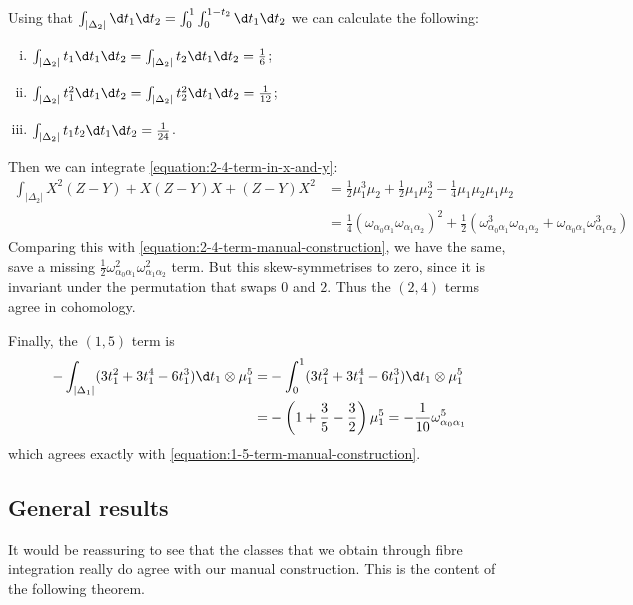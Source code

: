         Using that $\int_{|\Delta_2|}\d t_1\d t_2=\int_0^1\int_0^{1-t_2}\d t_1\d t_2$ we can calculate the following:
        \begin{enumerate}[(i)]
            \item $\int_{|\Delta_2|}t_1\d t_1\d t_2=\int_{|\Delta_2|}t_2\d t_1\d t_2=\frac16$;
            \item $\int_{|\Delta_2|}t_1^2\d t_1\d t_2=\int_{|\Delta_2|}t_2^2\d t_1\d t_2=\frac{1}{12}$;
            \item $\int_{|\Delta_2|}t_1t_2\d t_1\d t_2=\frac{1}{24}$.
        \end{enumerate}
        Then we can integrate \cref{equation:2-4-term-in-x-and-y}:
        \begin{align*}
            \int_{|\Delta_2|}X^2(Z-Y) + X(Z-Y)X + (Z-Y)X^2 &= \frac12\mu_1^3\mu_2 + \frac12\mu_1\mu_2^3 - \frac14\mu_1\mu_2\mu_1\mu_2\\
            &= \frac14(\omega_{\alpha_0\alpha_1}\omega_{\alpha_1\alpha_2})^2 + \frac12(\omega_{\alpha_0\alpha_1}^3\omega_{\alpha_1\alpha_2} + \omega_{\alpha_0\alpha_1}\omega_{\alpha_1\alpha_2}^3)
        \end{align*}
        Comparing this with \cref{equation:2-4-term-manual-construction}, we have the same, save a missing $\frac12\omega_{\alpha_0\alpha_1}^2\omega_{\alpha_1\alpha_2}^2$ term.
        But this skew-symmetrises to zero, since it is invariant under the permutation that swaps $0$ and $2$.
        Thus the $(2,4)$ terms agree in cohomology.

        \bigskip

        Finally, the $(1,5)$ term is
        \begin{align*}
            -\int_{|\Delta_1|}(3t_1^2+ 3t_1^4 - 6t_1^3)\d t_1\otimes\mu_1^5 = &-\int_0^1 (3t_1^2+ 3t_1^4 - 6t_1^3)\d t_1\otimes\mu_1^5\\
            =&-\left(1+\frac35-\frac32\right)\mu_1^5 = -\frac{1}{10}\omega_{\alpha_0\alpha_1}^5
        \end{align*}
        which agrees exactly with \cref{equation:1-5-term-manual-construction}.


    \subsection{General results} %
    \label{sub:general_results}

        It would be reassuring to see that the classes that we obtain through fibre integration really do agree with our manual construction.
        This is the content of the following theorem.

